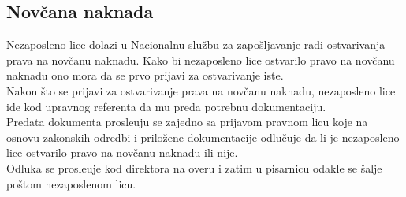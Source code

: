 \subsection{Nov\v cana naknada}

Nezaposleno lice dolazi u Nacionalnu slu\v zbu za zapo\v sljavanje radi ostvarivanja prava na nov\v canu naknadu. Kako bi nezaposleno lice ostvarilo pravo na nov\v canu naknadu ono mora da se prvo prijavi za ostvarivanje iste.
\\
Nakon \v sto se prijavi za ostvarivanje prava na nov\v canu naknadu, nezaposleno lice ide kod upravnog referenta da mu preda potrebnu dokumentaciju.
\\ Predata dokumenta prosle\dj uju se zajedno sa prijavom pravnom licu koje na osnovu zakonskih odredbi i prilo\v zene dokumentacije odlu\v cuje da li je nezaposleno lice ostvarilo pravo na nov\v canu naknadu ili nije.
\\
Odluka se prosle\dj uje kod direktora na overu i zatim u pisarnicu odakle se \v salje po\v stom nezaposlenom licu.

